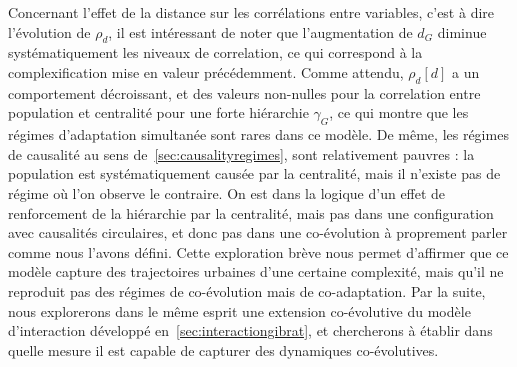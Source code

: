 Concernant l'effet de la distance sur les corrélations entre variables, c'est à dire l'évolution de $\rho_d$, il est intéressant de noter que l'augmentation de $d_G$ diminue systématiquement les niveaux de correlation, ce qui correspond à la complexification mise en valeur précédemment. Comme attendu, $\rho_d\left[d\right]$ a un comportement décroissant, et des valeurs non-nulles pour la correlation entre population et centralité pour une forte hiérarchie $\gamma_G$, ce qui montre que les régimes d'adaptation simultanée sont rares dans ce modèle. De même, les régimes de causalité au sens de~\ref{sec:causalityregimes}, sont relativement pauvres : la population est systématiquement causée par la centralité, mais il n'existe pas de régime où l'on observe le contraire. On est dans la logique d'un effet de renforcement de la hiérarchie par la centralité, mais pas dans une configuration avec causalités circulaires, et donc pas dans une co-évolution à proprement parler comme nous l'avons défini. Cette exploration brève nous permet d'affirmer que ce modèle capture des trajectoires urbaines d'une certaine complexité, mais qu'il ne reproduit pas des régimes de co-évolution mais de co-adaptation. Par la suite, nous explorerons dans le même esprit une extension co-évolutive du modèle d'interaction développé en~\ref{sec:interactiongibrat}, et chercherons à établir dans quelle mesure il est capable de capturer des dynamiques co-évolutives.



